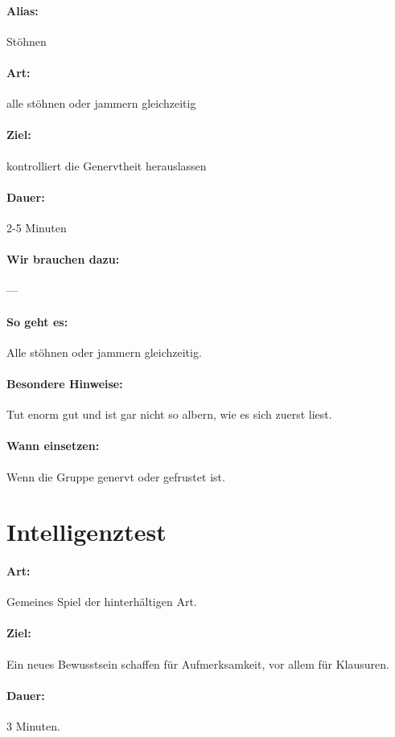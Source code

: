 \paragraph{Alias:} Stöhnen
\paragraph{Art:} alle stöhnen oder jammern gleichzeitig
\paragraph{Ziel:} kontrolliert die Genervtheit herauslassen
\paragraph{Dauer:} 2-5 Minuten
\paragraph{Wir brauchen dazu:} ---
\paragraph{So geht es:} Alle stöhnen oder jammern gleichzeitig.
\paragraph{Besondere Hinweise:} Tut enorm gut und ist gar nicht so albern, wie es sich zuerst liest.
\paragraph{Wann einsetzen:} Wenn die Gruppe genervt oder gefrustet ist.

\section{Intelligenztest}
\paragraph{Art:} Gemeines Spiel der hinterhältigen Art.
\paragraph{Ziel:} Ein neues Bewusstsein schaffen für Aufmerksamkeit, vor allem für Klausuren.
\paragraph{Dauer:} 3 Minuten.
